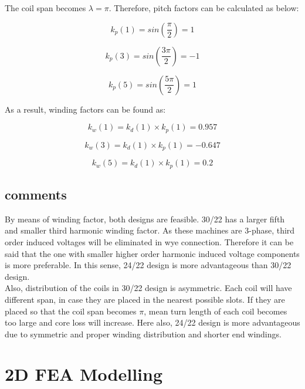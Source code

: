 \documentclass{reportClass}
\begin{document}
The coil span becomes $\lambda = \pi$. Therefore, pitch factors can be calculated as below:

\begin{equation*}
    k_p(1) = sin(\dfrac{\pi}{2}) = 1
\end{equation*}

\begin{equation*}
    k_p(3) = sin(\dfrac{3\pi}{2}) = -1
\end{equation*}

\begin{equation*}
    k_p(5) = sin(\dfrac{5\pi}{2}) = 1
\end{equation*}

As a result, winding factors can be found as:

\begin{equation*}
    k_w(1) = k_d(1)\times k_p(1) = 0.957
\end{equation*}

\begin{equation*}
    k_w(3) =  k_d(1)\times k_p(1) = -0.647
\end{equation*}

\begin{equation*}
    k_w(5) =  k_d(1)\times k_p(1) = 0.2
\end{equation*}

\subsection{comments}

By means of winding factor, both designs are feasible. 30/22 has a larger fifth and smaller third harmonic winding factor. As these machines are 3-phase, third order induced voltages will be eliminated in wye connection. Therefore it can be said that the one with smaller higher order harmonic induced voltage components is more preferable. In this sense, 24/22 design is more advantageous than 30/22 design.\\

Also, distribution of the coils in 30/22 design is asymmetric. Each coil will have different span, in case they are placed in the nearest possible slots. If they are placed so that the coil span becomes $\pi$, mean turn length of each coil becomes too large and core loss will increase. Here also, 24/22 design is more advantageous due to symmetric and proper winding distribution and shorter end windings.\\


\section{2D FEA Modelling}
\end{document}
